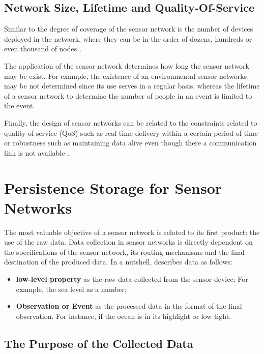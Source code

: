 \subsection{Network Size, Lifetime and Quality-Of-Service}

Similar to the degree of coverage of the sensor network is the number of
devices deployed in the network, where they can be in the order of dozens,
hundreds or even thousand of nodes \cite{sn-intro01}.

The application of the sensor network determines how long the sensor network
may be exist. For example, the existence of an environmental sensor networks
\cite{sn-ex01} may be not determined since its use serves in a regular basis,
whereas the lifetime of a sensor network to determine the number of people in
an event is limited to the event.

Finally, the design of sensor networks can be
related to the constraints related to quality-of-service (QoS) such as
real-time delivery within a certain period of time or robustness such as
maintaining data alive even though there a communication link is not available
\cite{sn-intro02}.

\section{Persistence Storage for Sensor Networks}

The most valuable objective of a sensor network is related to its first
product: the use of the raw data. Data collection in sensor networks is
directly dependent on the specifications of the sensor network, its routing
mechanisms and the final destination of the produced data. In a nutshell,
\cite{sn-storage03} describes data as follows:

\begin{itemize}
  \item \textbf{low-level property} as the raw data collected from the sensor
  device; For example, the sea level as a number;
  \item \textbf{Observation or Event} as the processed data in the format of
  the final observation. For instance, if the ocean is in its highlight or low
  tight.
\end{itemize}

\subsection{The Purpose of the Collected Data}
\label{sec:sn-data-purpose}

